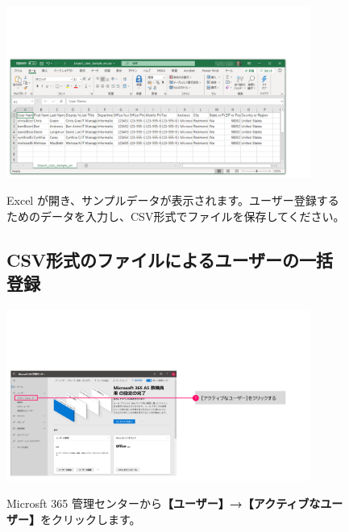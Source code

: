 \begin{figure}[h]
    \begin{minipage}{0.6\textwidth}
        \vspace{-2cm}
        \includegraphics[width=10cm]{figures/CSV_Import-4.png}
    \end{minipage}
    \begin{minipage}{0.4\textwidth}
        Excel が開き、サンプルデータが表示されます。ユーザー登録するためのデータを入力し、CSV形式でファイルを保存してください。
    \end{minipage}

\end{figure}

\newpage

\begin{figure}[]
    \subsection{CSV形式のファイルによるユーザーの一括登録}
\end{figure}

\begin{figure}[h]
    \begin{minipage}{0.6\textwidth}
        \vspace{-1cm}
        \includegraphics[width=10cm]{figures/CSV_Import-5.png}
    \end{minipage}
    \begin{minipage}{0.4\textwidth}
        Microsft 365 管理センターから\textbf{【ユーザー】→【アクティブなユーザー】}をクリックします。
    \end{minipage}
\end{figure}

